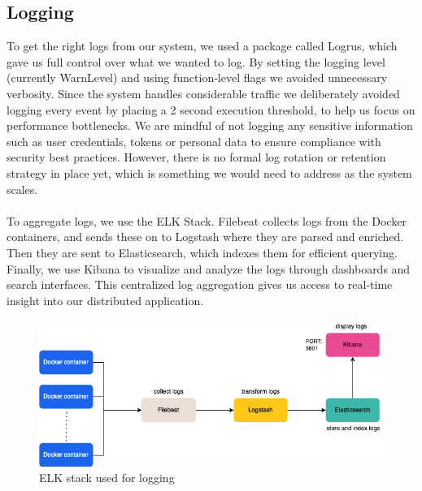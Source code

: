 \subsection{Logging}
\label{sec:logging}
To get the right logs from our system, we used a package called Logrus, which gave us full control over what we wanted to log. By setting the logging level (currently WarnLevel) and using function-level flags we avoided unnecessary verbosity. Since the system handles considerable traffic we deliberately avoided logging every event by placing a 2 second execution threshold, to help us focus on performance bottlenecks. We are mindful of not logging any sensitive information such as user credentials, tokens or personal data to ensure compliance with security best practices. However, there is no formal log rotation or retention strategy in place yet, which is something we would need to address as the system scales.\\\\
To aggregate logs, we use the ELK Stack. Filebeat collects logs from the Docker containers, and sends these on to Logstash where they are parsed and enriched. Then they are sent to Elasticsearch, which indexes them for efficient querying. Finally, we use Kibana to visualize and analyze the logs through dashboards and search interfaces. This centralized log aggregation gives us access to real-time insight into our distributed application.

\begin{figure} [!htb]
    \centering
    \includegraphics[width=1.0\linewidth]{Images/ELK_diagram.drawio.png}
    \caption{ELK stack used for logging}
    \label{fig:dashboard}
\end{figure}


